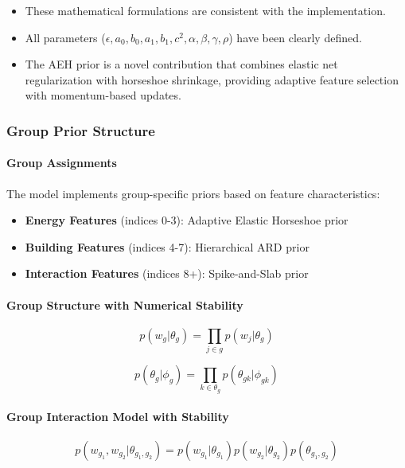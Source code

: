 \begin{itemize}

\item These mathematical formulations are consistent with the implementation.

\item All parameters ($\epsilon, a_0, b_0, a_1, b_1, c^2, \alpha, \beta, \gamma, \rho$) have been clearly defined.

\item The AEH prior is a novel contribution that combines elastic net regularization with horseshoe shrinkage, providing adaptive feature selection with momentum-based updates.

\end{itemize}

\subsubsection{Group Prior Structure}

\paragraph{Group Assignments}
The model implements group-specific priors based on feature characteristics:

\begin{itemize}
\item \textbf{Energy Features} (indices 0-3): Adaptive Elastic Horseshoe prior
\item \textbf{Building Features} (indices 4-7): Hierarchical ARD prior  
\item \textbf{Interaction Features} (indices 8+): Spike-and-Slab prior
\end{itemize}

\paragraph{Group Structure with Numerical Stability}

\[
p(w_g|\theta_g) = \prod_{j \in g} p(w_j|\theta_g)
\]

\[
p(\theta_g|\phi_g) = \prod_{k \in \theta_g} p(\theta_{gk}|\phi_{gk}) 
\]

\paragraph{Group Interaction Model with Stability}

\[
p(w_{g_1},w_{g_2}|\theta_{g_1,g_2}) = p(w_{g_1}|\theta_{g_1})p(w_{g_2}|\theta_{g_2})p(\theta_{g_1,g_2})
\]

